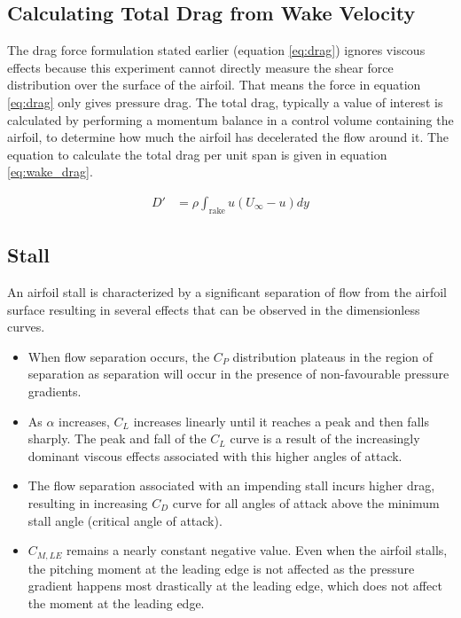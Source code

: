 \documentclass[runningheads]{llncs}
\begin{document}
\subsection{Calculating Total Drag from Wake Velocity}

\noindent
The drag force formulation stated earlier (equation \ref{eq:drag}) ignores viscous effects because this experiment cannot directly measure the shear force distribution over the surface of the airfoil. That means the force in equation \ref{eq:drag} only gives pressure drag. The total drag, typically a value of interest is calculated by performing a momentum balance in a control volume containing the airfoil, to determine how much the airfoil has decelerated the flow around it. The equation to calculate the total drag per unit span is given in equation \ref{eq:wake_drag}.\newline

\begin{align}
    D' &= \rho\int_{\text{rake}} u (U_\infty - u) dy \label{eq:wake_drag}
\end{align}

\subsection{Stall}

\noindent
An airfoil stall is characterized by a significant separation of flow from the airfoil surface resulting in several effects that can be observed in the dimensionless curves.

\begin{itemize}

    \item When flow separation occurs, the $C_P$ distribution plateaus in the region of separation as separation will occur in the presence of non-favourable pressure gradients.
    
    \item As $\alpha$ increases, $C_L$ increases linearly until it reaches a peak and then falls sharply. The peak and fall of the $C_L$ curve is a result of the increasingly dominant viscous effects associated with this higher angles of attack.
    
    \item The flow separation associated with an impending stall incurs higher drag, resulting in increasing $C_D$ curve for all angles of attack above the minimum stall angle (critical angle of attack).
    
    \item $C_{M, LE}$ remains a nearly constant negative value. Even when the airfoil stalls, the pitching moment at the leading edge is not affected as the pressure gradient happens most drastically at the leading edge, which does not affect the moment at the leading edge.
    
\end{itemize}
\end{document}
